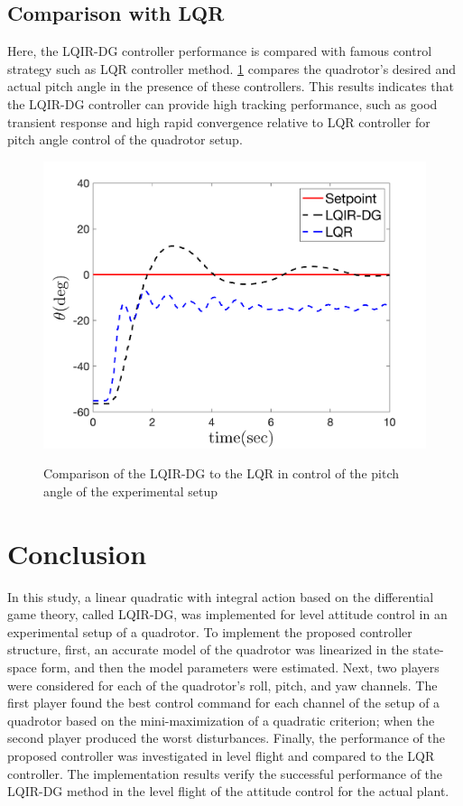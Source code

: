 \documentclass[conference]{IEEEtran}
\begin{document}
\subsection{Comparison with LQR}
\noindent Here, the LQIR-DG controller performance is compared with famous control strategy such as LQR controller method. \figurename{\ref{fig:compare}} compares the quadrotor's desired and actual pitch angle in the presence of these controllers. This results indicates that the LQIR-DG controller can provide high tracking performance, such as good transient response and high rapid convergence relative to LQR controller for pitch angle control of the quadrotor setup.
\begin{figure}[!h]
	\centering
	{\includegraphics[width=.9\linewidth]{../Figures/Calibration/LQIDGvsLQR/Pitch/lqidgvslqr_pitch.png}
	}
	\caption{Comparison of the LQIR-DG to the LQR in control of the pitch angle of the experimental setup}
	\label{fig:compare}
\end{figure}
\section{Conclusion}\label{sec:conclusion}
\noindent In this study, a linear quadratic with integral action based on the differential game theory, called LQIR-DG, was implemented for level attitude control in an experimental setup of a quadrotor. To implement the proposed controller structure, first, an accurate model of the quadrotor was linearized in the state-space form, and then the model parameters were estimated. Next, two players were considered for each of the quadrotor's roll, pitch, and yaw channels. The first player found the best control command for each channel of the setup of a quadrotor based on the mini-maximization of a quadratic criterion; when the second player produced the worst disturbances. Finally, the performance of the proposed controller was investigated in level flight and compared to the LQR controller. The implementation results verify the successful performance of the LQIR-DG method in the level flight of the attitude control for the actual plant.
\end{document}
